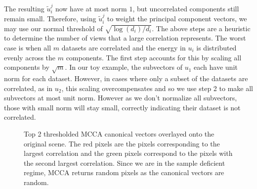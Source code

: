 The resulting $\widetilde{u}_i^j$ now have at most norm $1$, but uncorrelated components
still remain small. Therefore, using $\widetilde{u}_i^j$ to weight the principal component
vectors, we may use our normal threshold of $\sqrt{\log(d_i)/d_i}$. The above steps are a
heuristic to determine the number of views that a large correlation represents. The worst
case is when all $m$ datasets are correlated and the energy in $u_i$ is distributed evenly
across the $m$ components. The first step accounts for this by scaling all components by
$\sqrt{m}$. In our toy example, the subvectors of $u_1$ each have unit norm for each
dataset. However, in cases where only a subset of the datasets are correlated, as in
$u_2$, this scaling overcompensates and so we use step 2 to make all subvectors at
most unit norm. However as we don't normalize all subvectors, those with small norm will
stay small, correctly indicating their dataset is not correlated.




\begin{figure}
  \begin{center}
    \caption{Top 2 thresholded MCCA canonical vectors overlayed onto the original
      scene. The red pixels are the pixels corresponding to the largest correlation and
      the green pixels correspond to the pixels with the second largest correlation. Since
      we are in the sample deficient regime, MCCA returns random pixels as the canonical
      vectors are random.}
    \label{fig:chpt10:mcca_cca_vects}
  \end{center}
\end{figure}

